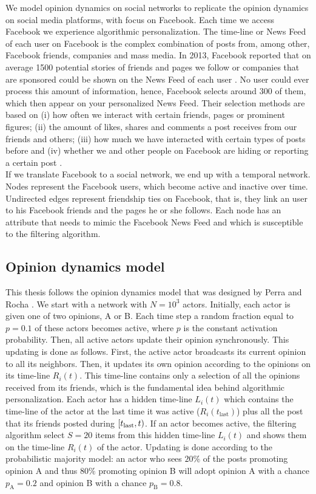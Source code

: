 \documentclass[11 pt , letterpaper , twoside , openright]{book}
\begin{document}
We model opinion dynamics on social networks to replicate the opinion dynamics on social media platforms, with focus on Facebook. Each time we access Facebook we experience algorithmic personalization. The time-line or News Feed of each user on Facebook is the complex combination of posts from, among other, Facebook friends, companies and mass media. In 2013, Facebook reported that on average 1500 potential stories of friends and pages we follow or companies that are sponsored could be shown on the News Feed of each user \cite{facebook}. No user could ever process this amount of information, hence, Facebook selects around 300 of them, which then appear on your personalized News Feed. Their selection methods are based on (i) how often we interact with certain friends, pages or prominent figures; (ii) the amount of likes, shares and comments a post receives from our friends and others; (iii) how much we have interacted with certain types of posts before and (iv) whether we and other people on Facebook are hiding or reporting a certain post \cite{facebook}. \\
\newline
If we translate Facebook to a social network, we end up with a temporal network. Nodes represent the Facebook users, which become active and inactive over time. Undirected edges represent friendship ties on Facebook, that is, they link an user to his Facebook friends and the pages he or she follows. Each node has an attribute that needs to mimic the Facebook News Feed and which is susceptible to the filtering algorithm.

\subsection{Opinion dynamics model}

This thesis follows the opinion dynamics model that was designed by Perra and Rocha \cite{Perra2019}. We start with a network with $N = 10^3$ actors.  Initially, each actor is given one of two opinions, A or B. Each time step a random fraction equal to $p= 0.1$ of these actors becomes active, where $p$ is the constant activation probability. Then, all active actors update their opinion synchronously. This updating is done as follows. First, the active actor broadcasts its current opinion to all its neighbors. Then, it updates its own opinion according to the opinions on its time-line $R_i(t)$. This time-line contains only a selection of all the opinions received from its friends, which is the fundamental idea behind algorithmic personalization. Each actor has a hidden time-line $L_i(t)$ which contains the time-line of the actor at the last time it was active ($R_i(t_{\text{last}})$) plus all the post that its friends posted during $\interval[right open fence =), open right]{t_\text{last}}{t}$. If an actor becomes active, the filtering algorithm select $S = 20$ items from this hidden time-line $L_i(t)$ and shows them on the time-line $R_i(t)$ of the actor. Updating is done according to the probabilistic majority model: an actor who sees $20\%$ of the posts promoting opinion A and thus $80\%$ promoting opinion B will adopt opinion A with a chance $p_\text{A} = 0.2$ and opinion B with a chance $p_\text{B} = 0.8$.
\end{document}
